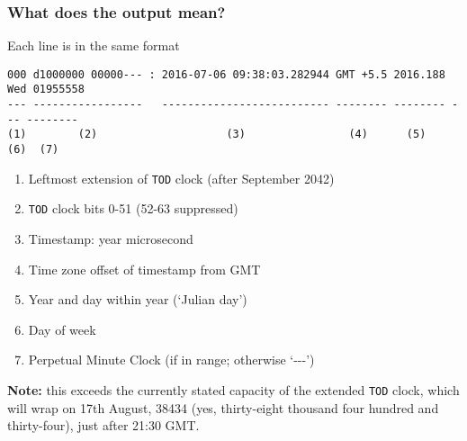 \documentclass[10pt,xcolor=x11names]{beamer}
\newcommand{\tod}{\texttt{TOD}}
\begin{document}
\begin{frame}[fragile]
  \frametitle{What does the output mean?}
  \begin{block}{Each line is in the same format}
  \begin{lstlisting}
000 d1000000 00000--- : 2016-07-06 09:38:03.282944 GMT +5.5 2016.188 Wed 01955558
--- -----------------   -------------------------- -------- -------- --- --------
(1)        (2)                    (3)                (4)      (5)    (6)  (7)
  \end{lstlisting}
  \end{block}

  \begin{enumerate}
  \item Leftmost extension of \tod{} clock (after September 2042)
  \item \tod{} clock bits 0-51 (52-63 suppressed)
  \item Timestamp: year \textellipsis{} microsecond
  \item Time zone offset of timestamp from GMT
  \item Year and day within year (`Julian day')
  \item Day of week
  \item Perpetual Minute Clock (if in range; otherwise `-{}-{}-')
  \end{enumerate}

  \textbf{Note:} this exceeds the currently stated capacity of the
  extended \tod{} clock, which will wrap on 17th August, 38434
  (yes,   thirty-eight thousand four hundred and thirty-four),
  just after 21:30 GMT.

\end{frame}
\end{document}
